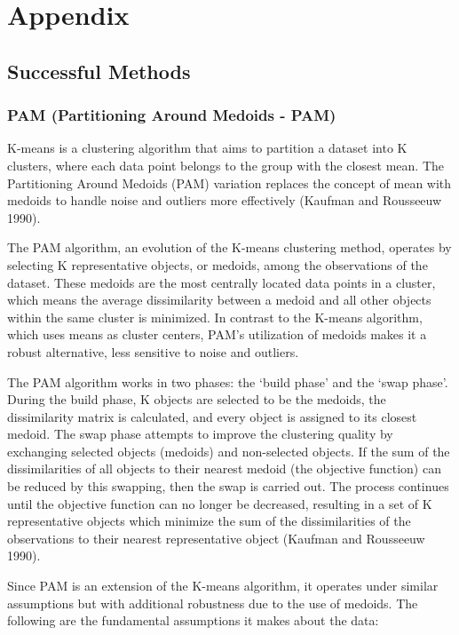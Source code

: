 \documentclass[11pt, a4paper]{article}
\begin{document}
\section{Appendix}


\subsection{Successful Methods}\label{appendix:successful}


\subsubsection{PAM (Partitioning Around Medoids - PAM)}

K-means is a clustering algorithm that aims to partition a dataset into K clusters, where each data point belongs to the group with the closest mean. The Partitioning Around Medoids (PAM) variation replaces the concept of mean with medoids to handle noise and outliers more effectively (Kaufman and Rousseeuw 1990).
\par
The PAM algorithm, an evolution of the K-means clustering method, operates by selecting K representative objects, or medoids, among the observations of the dataset. These medoids are the most centrally located data points in a cluster, which means the average dissimilarity between a medoid and all other objects within the same cluster is minimized. In contrast to the K-means algorithm, which uses means as cluster centers, PAM's utilization of medoids makes it a robust alternative, less sensitive to noise and outliers.
\par
The PAM algorithm works in two phases: the `build phase' and the `swap phase'. During the build phase, K objects are selected to be the medoids, the dissimilarity matrix is calculated, and every object is assigned to its closest medoid. The swap phase attempts to improve the clustering quality by exchanging selected objects (medoids) and non-selected objects. If the sum of the dissimilarities of all objects to their nearest medoid (the objective function) can be reduced by this swapping, then the swap is carried out. The process continues until the objective function can no longer be decreased, resulting in a set of K representative objects which minimize the sum of the dissimilarities of the observations to their nearest representative object (Kaufman and Rousseeuw 1990).
\par
Since PAM is an extension of the K-means algorithm, it operates under similar assumptions but with additional robustness due to the use of medoids. The following are the fundamental assumptions it makes about the data:
\end{document}
